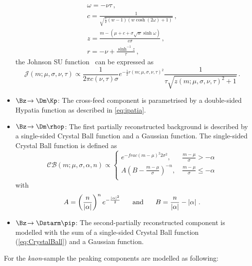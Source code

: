 \begin{itemize}
\begin{align*}
	&\omega=-\nu\tau\,,&\\
	&c=\frac{1}{\sqrt{\frac{1}{2}\left(w-1\right)\left(w\cosh\!\left(2\omega\right)+1\right)}}\,,&\\
	&z=\frac{m-\left(\mu+c+\sigma\sqrt{w}\sinh\omega\right)}{c\sigma}\,,&\\
	&r=-\nu+\frac{\sinh^{-1}z}{\tau}\,,&
	\end{align*}
	the Johnson SU function~\cite{JohnsonSU} can be expressed as
	\begin{equation}
	\mathcal{J}\!\left(m;\mu,\sigma,\nu,\tau\right)\propto\frac{1}{2\pi c(\nu,\tau)\sigma}e^{-\frac{1}{2}r(m;\mu,\sigma,\nu,\tau)^2}\frac{1}{\tau\sqrt{z(m;\mu,\sigma,\nu,\tau)^2+1}}\,.\label{eq:johnsonsu}
	\end{equation}
	\item $\Bz\!\to\Dm\Kp$: The cross-feed component is parametrised by a double-sided Hypatia function as described in \cref{eq:ipatia}.
	\item $\Bz\!\to\Dm\rhop$: The first partially reconstructed background is described by a single-sided Crystal Ball function and a Gaussian function.
	The single-sided Crystal Ball function is defined as
	\begin{equation}
	\mathcal{C\!B}\!\left(m;\mu,\sigma,\alpha,n\right)\propto\begin{cases}
	e^{-frac{(m-\mu)^2}{2\sigma^2}}, &\, \frac{m-\mu}{\sigma}>-\alpha\\
	A\left(B-\frac{m-\mu}{\sigma}\right)^{-n}, &\, \frac{m-\mu}{\sigma}\leq-\alpha\\\end{cases}\label{eq:CrystalBall}
	\end{equation}
	with
	\begin{equation}
	A=\left(\frac{n}{\left|\alpha\right|}\right)^{n}e^{-\frac{\left|\alpha\right|^2}{2}}\hspace{0.5cm}\text{ and }\hspace{0.5cm}B=\frac{n}{\left|\alpha\right|}-\left|\alpha\right|\,.
	\end{equation}
	\item $\Bz\!\to\Dstarm\pip$: The second-partially reconstructed component is modelled with the sum of a single-sided Crystal Ball function (\cref{eq:CrystalBall}) and a Gaussian function.
\end{itemize}
For the \emph{kaon}-sample the peaking components are modelled as following:
